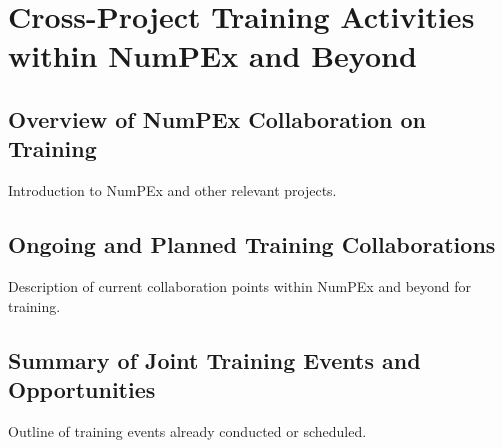 \chapter{Cross-Project Training Activities within NumPEx and Beyond}
\label{chap:training-beyond}

\section{Overview of NumPEx Collaboration on Training}
Introduction to NumPEx and other relevant projects.
\section{Ongoing and Planned Training Collaborations}
Description of current collaboration points within NumPEx and beyond for training.
\section{Summary of Joint Training Events and Opportunities}
Outline of training events already conducted or scheduled.

\